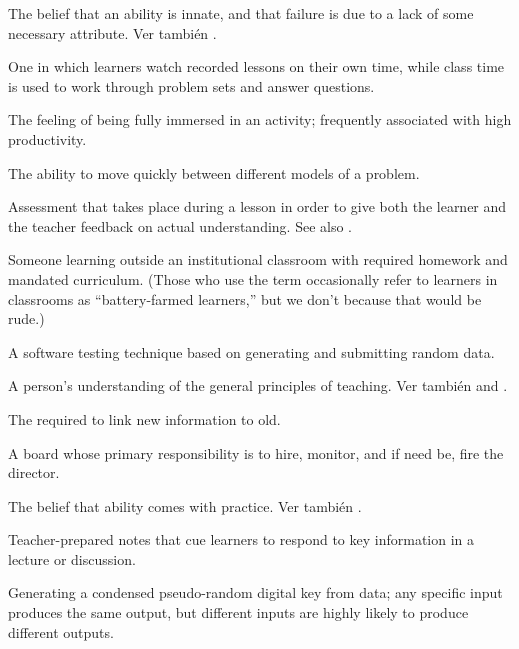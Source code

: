 \begin{description}
 The belief that an ability is innate,
and that failure is due to a lack of some necessary attribute. Ver también
.

 One in which learners watch
recorded lessons on their own time, while class time is used to work through
problem sets and answer questions.

 The feeling of being fully immersed in an activity;
frequently associated with high productivity.

 The ability to move
quickly between different models of a problem.

 Assessment that takes
place during a lesson in order to give both the learner and the teacher
feedback on actual understanding. See
also .

 Someone learning outside an
institutional classroom with required homework and mandated curriculum. (Those
who use the term occasionally refer to learners in classrooms as
``battery-farmed learners,'' but we don't because that would be rude.)

 A software testing technique based on
generating and submitting random data.

 A
person's understanding of the general principles of teaching. Ver también
and .

 The 
required to link new information to old.

 A board whose primary responsibility is
to hire, monitor, and if need be, fire the director.

 The belief that ability comes with
practice. Ver también .

 Teacher-prepared notes that cue
learners to respond to key information in a lecture or discussion.

 Generating a condensed pseudo-random digital key
from data; any specific input produces the same output, but different inputs are
highly likely to produce different outputs.


\end{description}

